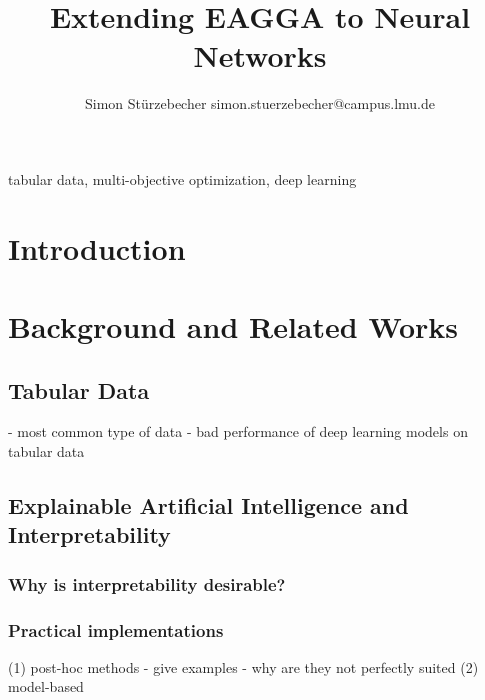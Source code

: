 \documentclass[twoside,11pt]{article}
\begin{document}
\title{Extending EAGGA to Neural Networks}

\author{\name Simon Stürzebecher \email simon.stuerzebecher@campus.lmu.de}


\maketitle

\begin{abstract}%
\end{abstract}

\begin{keywords}
  tabular data, multi-objective optimization, deep learning
\end{keywords}

\section{Introduction}



\section{Background and Related Works}

\subsection{Tabular Data}
- most common type of data
- bad performance of deep learning models on tabular data

\subsection{Explainable Artificial Intelligence and Interpretability}
\subsubsection{Why is interpretability desirable?}
\subsubsection{Practical implementations}
(1) post-hoc methods
  - give examples
  - why are they not perfectly suited
(2) model-based
\end{document}
